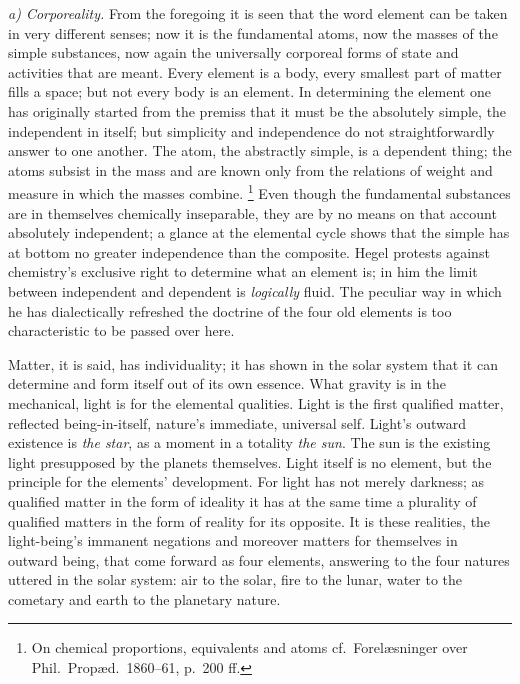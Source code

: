\documentclass[12pt,a4paper]{book}
\newcommand{\runin}[1]{\emph{#1}\hspace{0.4em}}
\begin{document}
\runin{a) Corporeality.} From the foregoing it is seen that the word element can be taken in very different senses;
now it is the fundamental atoms, now the masses of the simple substances, now again the universally corporeal forms
of state and activities that are meant. Every element is a body, every smallest part of matter fills a space; but not
every body is an element. In determining the element one has originally started from the premiss that it must be the
absolutely simple, the independent in itself; but simplicity and independence do not straightforwardly answer to one
another. The atom, the abstractly
simple, is a dependent thing; the atoms subsist in the mass and are known only from the relations of weight and
measure in which the masses combine.%
\footnote{%
On chemical proportions, equivalents and atoms cf.\ Forelæsninger over Phil.\ Propæd.\ 1860--61, p.\ 200 ff.}
Even though the fundamental substances are in themselves chemically inseparable, they are by no means on that account
absolutely independent; a glance at the elemental cycle shows that the simple has at bottom no greater independence
than the composite. Hegel protests against chemistry's exclusive right to determine what an element is; in him the
limit between independent and dependent is \emph{logically} fluid. The peculiar way in which he has dialectically
refreshed the doctrine of the four old elements is too characteristic to be passed over here.

Matter, it is said, has individuality; it has shown in the solar system that it can determine and form itself out of
its own essence. What gravity is in the mechanical, light is for the elemental qualities. Light is the first
qualified matter, reflected being-in-itself, nature's immediate, universal self. Light's outward existence
is \emph{the star}, as a moment in a totality \emph{the sun}. The sun is the existing light presupposed by the
planets themselves. Light itself is no element, but the principle for the elements' development. For light has not
merely darkness; as qualified matter in the form of ideality it has at the same time a plurality of qualified matters
in the form of reality for its opposite. It is these realities, the light-being's immanent negations and moreover
matters for themselves in outward being, that come forward as four elements, answering to the four natures uttered in
the solar system: air to the solar, fire to the lunar, water to the cometary and earth to the planetary nature.
\end{document}
